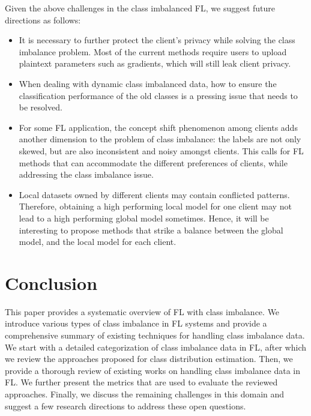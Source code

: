 \documentclass[10pt,journal,compsoc]{IEEEtran}
\begin{document}
Given the above challenges in the class imbalanced FL, we suggest future directions as follows:
\begin{itemize}
\item It is necessary to further protect the client's privacy while solving the class imbalance problem. Most of the current methods require users to upload plaintext parameters such as gradients, which will still leak client privacy.

\item When dealing with dynamic class imbalanced data, how to ensure the classification performance of the old classes is a pressing issue that needs to be resolved.

\item For some FL application, the concept shift phenomenon among clients adds another dimension to the problem of class imbalance: the labels are not only skewed, but are also inconsistent and noisy amongst clients. This calls for FL methods that can accommodate the different preferences of clients, while addressing the class imbalance issue.

\item Local datasets owned by different clients may contain conflicted patterns. Therefore, obtaining a high performing local model for one client may not lead to a high performing global model sometimes. Hence, it will be interesting to propose methods that strike a balance between the global model, and the local model for each client. 
\end{itemize}
\vspace{-0.25cm}

\section{Conclusion}
\label{sec:conclusion}
This paper provides a systematic overview of FL with class imbalance. We introduce various types of class imbalance in FL systems and provide a comprehensive summary of existing techniques for handling class imbalance data. We start with a detailed categorization of class imbalance data in FL, after which we review the approaches proposed for class distribution estimation. Then, we provide a thorough review of existing works on handling class imbalance data in FL. We further present the metrics that are used to evaluate the reviewed approaches. Finally, we discuss the remaining challenges in this domain and suggest a few research directions to address these open questions.
\vspace{-0.25cm}
\end{document}
